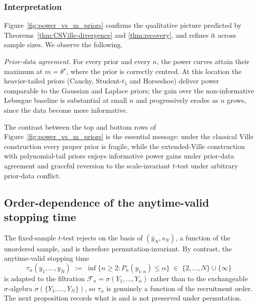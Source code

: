 \documentclass{article}%
\newcommand{\1}{\mathbf{1}}
\begin{document}
\subsubsection{Interpretation}\label{ssec:exp-interp}

Figure~\ref{fig:power_vs_m_priors} confirms the qualitative picture
predicted by Theorems~\ref{thm:CSVille-divergence} and \ref{thm:recovery}, and refines it across sample sizes. We observe the following.

\emph{Prior-data agreement.} For every prior and every \(n\), the power
curves attain their maximum at \(m=\theta^\star\), where the prior is
correctly centred. At this location the heavier-tailed priors (Cauchy, Student-$t_5$ and Horseshoe) deliver power comparable to the Gaussian and Laplace priors;
the gain over the non-informative Lebesgue baseline is substantial at
small \(n\) and progressively erodes as \(n\) grows, since the data become more informative.

The contrast between the top and bottom rows of Figure~\ref{fig:power_vs_m_priors} is the essential message: under the classical Ville construction every proper prior is fragile, while the
extended-Ville construction with polynomial-tail priors enjoys
informative power gains under prior-data agreement and graceful reversion to the scale-invariant \(t\)-test under arbitrary prior-data conflict.


\subsection{Order-dependence of the anytime-valid stopping time}
\label{sec:order-dependence}

The fixed-sample $t$-test rejects on the basis of $(\bar y_{N},s_{N})$, a function of the unordered sample, and is therefore permutation-invariant. By contrast, the anytime-valid stopping time
\[
   \tau_{\alpha}(y_{1},\ldots,y_{N}) \;:=\; \inf\bigl\{n\ge 2 : P_{n}(y_{1:n}) \le \alpha\bigr\} \;\in\; \{2,\ldots,N\}\cup\{\infty\}
\]
is adapted to the filtration $\mathcal{F}_{n}=\sigma(Y_{1},\ldots,Y_{n})$ rather than to the exchangeable $\sigma$-algebra $\sigma(\{Y_{1},\ldots,Y_{N}\})$, so $\tau_{\alpha}$ is genuinely a function of the recruitment order. The next proposition records what is and is not preserved under permutation.
\end{document}
